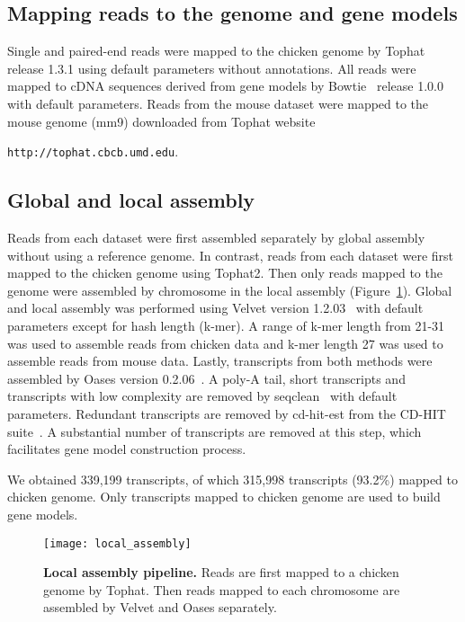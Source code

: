 \subsection{Mapping reads to the genome and gene models}

Single and paired-end reads were mapped to the chicken genome by
Tophat~\cite{Trapnell:2009dp} release 1.3.1 using default
parameters without annotations.  All reads were mapped to cDNA
sequences derived from gene models by
Bowtie~\cite{Langmead:2009fv} release 1.0.0 with default
parameters.  Reads from the mouse dataset were mapped to the
mouse genome (mm9) downloaded from Tophat website

\texttt{http://tophat.cbcb.umd.edu}.

\subsection{Global and local assembly}

Reads from each dataset were first assembled separately by global assembly
without using a reference genome.  In contrast, reads from each dataset were
first mapped to the chicken genome using Tophat2.  Then only reads mapped to
the genome were assembled by chromosome in the local assembly
(Figure~\ref{local_assembly}).  Global and local assembly was performed using
Velvet version 1.2.03~\cite{Zerbino:2008vu} with default parameters except for
hash length (k-mer).  A range of k-mer length from 21-31 was used to assemble
reads from chicken data and k-mer length 27 was used to assemble reads from
mouse data.  Lastly, transcripts from both methods were assembled by Oases
version 0.2.06~\cite{Schulz:2012je}.  A poly-A tail, short transcripts and
transcripts with low complexity are removed by seqclean~\cite{seqclean} with
default parameters.  Redundant transcripts are removed by cd-hit-est from the
CD-HIT suite~\cite{Li:2006hr}.  A substantial number of transcripts are removed
at this step, which facilitates gene model construction process.

We obtained 339,199 transcripts, of which 315,998 transcripts (93.2\%) mapped
to chicken genome.  Only transcripts mapped to chicken genome are used to build
gene models.

\begin{figure}[!ht]
\begin{center}
\texttt{[image: local\_assembly]}
\end{center}
\caption{
\textbf{Local assembly pipeline.}
Reads are first mapped to a chicken genome by Tophat.  Then reads
mapped to each chromosome are assembled by Velvet and Oases
separately.
}
\label{local_assembly}
\end{figure}

